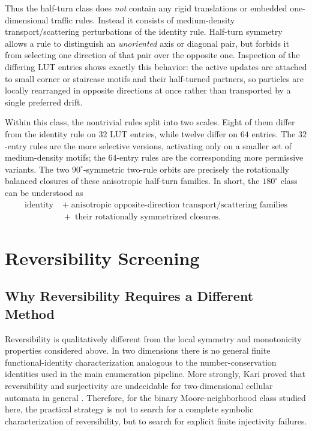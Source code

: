 \documentclass[11pt,a4paper]{article}
\begin{document}
Thus the half-turn class does \emph{not} contain any rigid translations or embedded
one-dimensional traffic rules.  Instead it consists of medium-density transport/scattering
perturbations of the identity rule.  Half-turn symmetry allows a rule to distinguish an
\emph{unoriented} axis or diagonal pair, but forbids it from selecting one direction of that
pair over the opposite one.  Inspection of the differing LUT entries shows exactly this
behavior: the active updates are attached to small corner or staircase motifs and their
half-turned partners, so particles are locally rearranged in opposite directions at once rather
than transported by a single preferred drift.

Within this class, the nontrivial rules split into two scales.  Eight of them differ from the
identity rule on \(32\) LUT entries, while twelve differ on \(64\) entries.  The \(32\)-entry
rules are the more selective versions, activating only on a smaller set of medium-density
motifs; the \(64\)-entry rules are the corresponding more permissive variants.  The two
\(90^\circ\)-symmetric two-rule orbits are precisely the rotationally balanced closures of these
anisotropic half-turn families.  In short, the \(180^\circ\) class can be understood as
\[
\begin{aligned}
\text{identity}
&\;+\;
\text{anisotropic opposite-direction transport/scattering families}\\
&\;+\;
\text{their rotationally symmetrized closures}.
\end{aligned}
\]

\section{Reversibility Screening}

\subsection{Why Reversibility Requires a Different Method}

Reversibility is qualitatively different from the local symmetry and monotonicity properties
considered above.  In two dimensions there is no general finite functional-identity
characterization analogous to the number-conservation identities used in the main enumeration
pipeline.  More strongly, Kari proved that reversibility and surjectivity are undecidable for
two-dimensional cellular automata in general \cite{Kari1990,Kari1994}.  Therefore, for the
binary Moore-neighborhood class studied here, the practical strategy is not to search for a
complete symbolic characterization of reversibility, but to search for explicit finite
injectivity failures.
\end{document}
